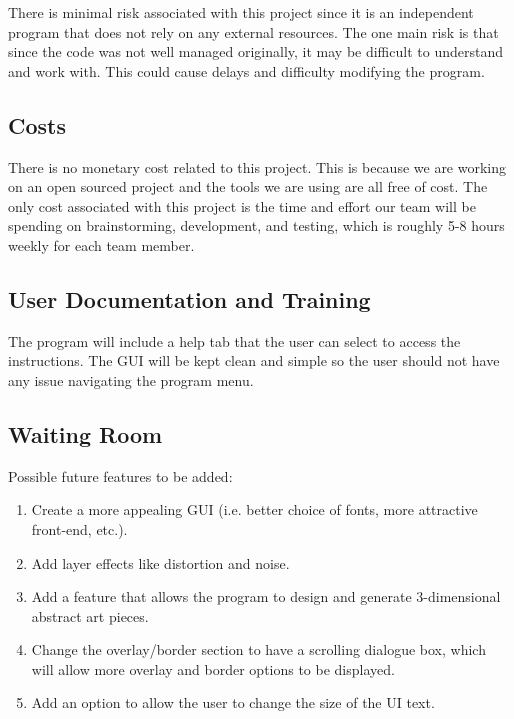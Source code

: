 \documentclass[12pt, titlepage]{article}
\begin{document}
There is minimal risk associated with this project since it is an independent program that does not rely on any external resources. The one main risk is that since the code was not well managed originally, it may be difficult to understand and work with. This could cause delays and difficulty modifying the program. 

\subsection{Costs}

There is no monetary cost related to this project. This is because we are working on an open sourced project and the tools we are using are all free of cost. The only cost associated with this project is the time and effort our team will be spending on brainstorming, development, and testing, which is roughly 5-8 hours weekly for each team member.

\subsection{User Documentation and Training}

The program will include a help tab that the user can select to access the instructions. The GUI will be kept clean and simple so the user should not have any issue navigating the program menu.

\subsection{Waiting Room}

Possible future features to be added:

\begin{enumerate}
    \item Create a more appealing GUI (i.e. better choice of fonts, more attractive front-end, etc.).
    \item Add layer effects like distortion and noise.
    \item Add a feature that allows the program to design and generate 3-dimensional abstract art pieces.
    \item \color{red} Change the overlay/border section to have a scrolling dialogue box, which will allow more overlay and border options to be displayed.
    \item \color{red} Add an option to allow the user to change the size of the UI text.
\end{enumerate}
\end{document}
